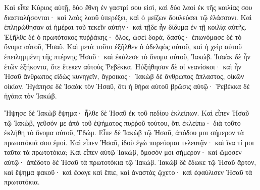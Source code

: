 {Καὶ εἶπε Κύριος αὐτῇ, δύο ἔθνη ἐν γαστρί σου εἰσὶ, καὶ δύο λαοὶ ἐκ τῆς κοιλίας σου διασταλήσονται· καὶ λαὸς λαοῦ ὑπερέξει, καὶ ὁ μείζων δουλεύσει τῷ ἐλάσσονι.
Καὶ ἐπληρώθησαν αἱ ἡμέραι τοῦ τεκεῖν αὐτήν· καὶ τῇδε ἦν δίδυμα ἐν τῇ κοιλίᾳ αὐτῆς.
Ἐξῆλθε δὲ ὁ πρωτότοκος πυῤῥάκης· ὅλος, ὡσεὶ δορὰ, δασύς· ἐπωνόμασε δὲ τὸ ὄνομα αὐτοῦ, Ἡσαῦ.
Καὶ μετὰ τοῦτο ἐξῆλθεν ὁ ἀδελφὸς αὐτοῦ, καὶ ἡ χεὶρ αὐτοῦ ἐπειλημμένη τῆς πτέρνης Ἡσαῦ· καὶ ἐκάλεσε τὸ ὄνομα αὐτοῦ, Ἰακώβ. Ἰσαὰκ δὲ ἦν ἐτῶν ἑξήκοντα, ὅτε ἔτεκεν αὐτοὺς Ῥεβέκκα.
Ηὐξήθησαν δὲ οἱ νεανίσκοι· καὶ ἦν Ἡσαῦ ἄνθρωπος εἰδὼς κυνηγεῖν, ἄγροικος· Ἰακὼβ δὲ ἄνθρωπος ἄπλαστος, οἰκῶν οἰκίαν.
Ἠγάπησε δὲ Ἰσαὰκ τὸν Ἡσαῦ, ὅτι ἡ θήρα αὐτοῦ βρῶσις αὐτῷ· Ῥεβέκκα δὲ ἠγάπα τὸν Ἰακώβ.
\par }{\PP {}Ἥψησε δὲ Ἰακὼβ ἕψημα· ἦλθε δὲ Ἡσαῦ ἐκ τοῦ πεδίου ἐκλείπων.
Καὶ εἶπεν Ἡσαῦ τῷ Ἰακὼβ, γεῦσόν με ἀπὸ τοῦ ἑψήματος πυῤῥοῦ τούτου, ὅτι ἐκλείπω· διὰ τοῦτο ἐκλήθη τὸ ὄνομα αὐτοῦ, Ἐδώμ.
Εἶπε δὲ Ἰακὼβ τῷ Ἡσαῦ, ἀπόδου μοι σήμερον τὰ πρωτοτόκιά σου ἐμοί.
Καὶ εἶπεν Ἡσαῦ, ἰδοὺ ἐγὼ πορεύομαι τελευτᾷν· καὶ ἵνα τί μοι ταῦτα τὰ πρωτοτόκια;
Καὶ εἶπεν αὐτῷ Ἰακὼβ, ὄμοσόν μοι σήμερον· καὶ ὤμοσεν αὐτῷ· ἀπέδοτο δὲ Ἡσαῦ τὰ πρωτοτόκια τῷ Ἰακώβ.
Ἰακὼβ δὲ ἔδωκε τῷ Ἠσαῦ ἄρτον, καὶ ἕψημα φακοῦ· καὶ ἔφαγε καὶ ἔπιε, καὶ ἀναστὰς ᾤχετο· καὶ ἐφαύλισεν Ἡσαῦ τὰ πρωτοτόκια.

}
